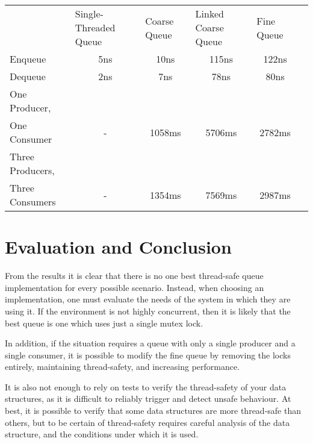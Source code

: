 \documentclass{article}
\begin{document}
\begin{table}[h]
\centering
\begin{tabular}{lccccl}
                                 & \multicolumn{1}{l}{Single-Threaded Queue} & \multicolumn{1}{l}{Coarse Queue} & \multicolumn{1}{l}{Linked Coarse Queue} & \multicolumn{1}{l}{Fine Queue} &   \\
Enqueue                          & 5ns                                       & 10ns                             & 115ns                                   & 122ns                          &   \\
Dequeue                          & 2ns                                       & 7ns                              & 78ns                                    & 80ns                           &   \\
One Producer,\\ One Consumer       & -                                         & 1058ms                           & 5706ms                                  & 2782ms                         &   \\
Three Producers,\\ Three Consumers & -                                         & 1354ms                           & 7569ms                                  & 2987ms                         &  
\end{tabular}
\end{table}

\section{Evaluation and Conclusion}
From the results it is clear that there is no one best thread-safe queue
implementation for every possible scenario. Instead, when choosing an
implementation, one must evaluate the needs of the system in which they are
using it. If the environment is not highly concurrent, then it is likely that
the best queue is one which uses just a single mutex lock.  

In addition, if the situation requires a queue with only a single producer and
a single consumer, it is possible to modify the fine queue by removing the locks
entirely, maintaining thread-safety, and increasing performance.

It is also not enough to rely on tests to verify the thread-safety of your
data structures, as it is difficult to reliably trigger and detect unsafe
behaviour. At best, it is possible to verify that some data structures are more
thread-safe than others, but to be certain of thread-safety requires careful
analysis of the data structure, and the conditions under which it is used.

\nocite{*}

\end{document}
